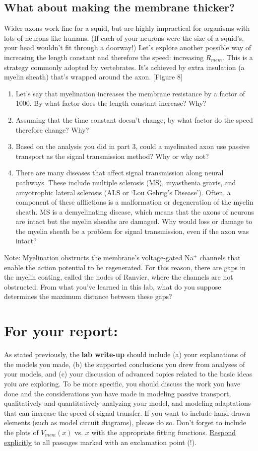 \subsection*{What about making the membrane thicker?}
Wider axons work fine for a squid, but are highly impractical for organisms with lots of neurons like humans.
(If each of your neurons were the size of a squid's, your head wouldn't fit through a doorway!)
Let's explore another possible way of increasing the length constant and therefore the speed: increasing $R_{mem}$.
This is a strategy commonly adopted by vertebrates.
It's achieved by extra insulation (a myelin sheath) that's wrapped around the axon. [Figure 8]
\begin{enumerate}
\itemsep-0.2em
\item Let's say that myelination increases the membrane resistance by a factor of 1000. By what factor does the length constant increase? Why?
\item Assuming that the time constant doesn't change, by what factor do the speed therefore change? Why?
\item Based on the analysis you did in part 3, could a myelinated axon use passive transport as the signal transmission method? Why or why not?
\item There are many diseases that affect signal transmission along neural pathways. These include multiple sclerosis (MS), myasthenia gravis, and amyotrophic lateral sclerosis (ALS or `Lou Gehrig's Disease'). Often, a component of these afflictions is a malformation or degeneration of the myelin sheath. MS is a demyelinating disease, which means that the axons of neurons are intact but the myelin sheaths are damaged. Why would loss or damage to the myelin sheath be a problem for signal transmission, even if the axon was intact?
\end{enumerate}
Note: Myelination obstructs the membrane's voltage-gated Na$^{+}$ channels that enable the action potential to be regenerated.
For this reason, there are gaps in the myelin coating, called the nodes of Ranvier, where the channels are not obstructed.
From what you've learned in this lab, what do you suppose determines the maximum distance between these gaps?

\section*{For your report:}
As stated previously, the \textbf{lab write-up} should include (a) your explanations of the models you made, (b) the supported conclusions you drew from analyses of your models, and (c) your discussion of advanced topics related to the basic ideas yoiu are exploring.
To be more specific, you should discuss the work you have done and the considerations you have made in modeling passive transport, qualitatively and quantitatively analyzing your model, and modeling adaptations that can increase the speed of signal transfer.
If you want to include hand-drawn elements (such as model circuit diagrams), please do so.
Don't forget to include the plots of $V_{mem}(x)$ vs. $x$ with the appropriate fitting functions. 
\underline{Respond explicitly} to all passages marked with an exclamation point (!).
